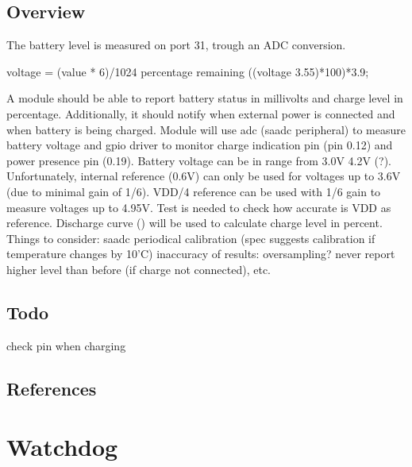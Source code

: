 \documentclass[letterpaper,10pt,english]{sphinxmanual}
\begin{document}
\subsection{Overview}
\label{\detokenize{drivers/battery:overview}}
The battery level is measured on port 31, trough an ADC conversion.

voltage = (value * 6)/1024
percentage remaining  ((voltage \sphinxhyphen{} 3.55)*100)*3.9;

A module should be able to report battery status in millivolts and charge level in percentage. Additionally, it should notify when external power is connected and when battery is being charged.
Module will use adc (saadc peripheral) to measure battery voltage and gpio driver to monitor charge indication pin (pin 0.12) and power presence pin (0.19).
Battery voltage can be in range from 3.0V \sphinxhyphen{} 4.2V (?). Unfortunately, internal reference (0.6V) can only be used for voltages up to 3.6V (due to minimal gain of 1/6). VDD/4 reference can be used with 1/6 gain to measure voltages up to 4.95V. Test is needed to check how accurate is VDD as reference.
Discharge curve () will be used to calculate charge level in percent.
Things to consider:
saadc periodical calibration (spec suggests calibration if temperature changes by 10’C)
inaccuracy of results: oversampling? never report higher level than before (if charge not connected), etc.


\subsection{Todo}
\label{\detokenize{drivers/battery:todo}}
check pin when charging


\subsection{References}
\label{\detokenize{drivers/battery:references}}


\section{Watchdog}
\label{\detokenize{drivers/watchdog:watchdog}}\label{\detokenize{drivers/watchdog::doc}}
\begin{sphinxVerbatim}[commandchars=\\\{\}]
\end{sphinxVerbatim}
\end{document}
